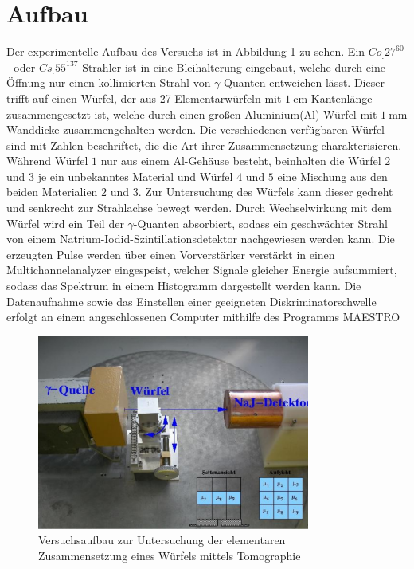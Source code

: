 \section{Aufbau}
\label{sec:Aufbau}

Der experimentelle Aufbau des Versuchs ist in Abbildung \ref{fig:aufbau} zu sehen.
Ein $Co_.{27}^\text{60}$- oder $Cs_.{55}^\text{137}$-Strahler ist in eine Bleihalterung eingebaut, welche durch eine Öffnung nur einen kollimierten Strahl von $\gamma$-Quanten entweichen lässt. Dieser trifft auf einen Würfel, der aus 27 Elementarwürfeln mit $\SI{1}{\centi\meter}$ Kantenlänge zusammengesetzt ist, welche durch einen großen Aluminium(Al)-Würfel mit $\SI{1}{\milli\meter}$ Wanddicke zusammengehalten werden.
Die verschiedenen verfügbaren Würfel sind mit Zahlen beschriftet, die die Art ihrer Zusammensetzung charakterisieren. Während Würfel $1$ nur aus einem Al-Gehäuse besteht, beinhalten die Würfel $2$ und $3$ je ein unbekanntes Material und Würfel $4$ und $5$ eine Mischung aus den beiden Materialien $2$ und $3$.
Zur Untersuchung des Würfels kann dieser gedreht und senkrecht zur Strahlachse bewegt werden.
Durch Wechselwirkung mit dem Würfel wird ein Teil der $\gamma$-Quanten absorbiert, sodass ein geschwächter Strahl von einem Natrium-Iodid-Szintillationsdetektor nachgewiesen werden kann. Die erzeugten Pulse werden über einen Vorverstärker verstärkt in einen Multichannelanalyzer eingespeist, welcher Signale gleicher Energie aufsummiert, sodass das Spektrum in einem Histogramm dargestellt werden kann.
Die Datenaufnahme sowie das Einstellen einer geeigneten Diskriminatorschwelle erfolgt an einem angeschlossenen Computer mithilfe des Programms MAESTRO
\begin{figure}
\centering
\includegraphics[keepaspectratio,width=0.8\textwidth]{content/images/aufbau.png}
\caption{Versuchsaufbau zur Untersuchung der elementaren Zusammensetzung eines Würfels mittels Tomographie\cite{V14}}
\label{fig:aufbau}
\end{figure}